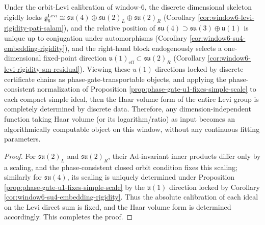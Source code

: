 \begin{corollary}\label{cor:window6-levi-haar-volume-rigidity}
Under the orbit-Levi calibration of window-\(6\), the discrete dimensional skeleton rigidly locks
\(
\mathfrak g^{\mathrm{Levi}}_6\cong \mathfrak{su}(4)\oplus \mathfrak{su}(2)_L\oplus \mathfrak{su}(2)_R
\)
(Corollary \ref{cor:window6-levi-rigidity-pati-salam}), and the relative position of \(\mathfrak{su}(4)\supset \mathfrak{su}(3)\oplus\mathfrak u(1)\) is unique up to conjugation under automorphisms (Corollary \ref{cor:window6-su4-embedding-rigidity}), and the right-hand block endogenously selects a one-dimensional fixed-point direction \(\mathfrak u(1)_{\mathrm{eff}}\subset \mathfrak{su}(2)_R\) (Corollary \ref{cor:window6-levi-rigidity-sm-residual}).
Viewing these \(u(1)\) directions locked by discrete certificate chains as phase-gate-transportable objects, and applying the phase-consistent normalization of Proposition \ref{prop:phase-gate-u1-fixes-simple-scale} to each compact simple ideal,
then the Haar volume form of the entire Levi group is completely determined by discrete data.
Therefore, any dimension-independent function taking Haar volume (or its logarithm/ratio) as input becomes an algorithmically computable object on this window, without any continuous fitting parameters.
\end{corollary}
\begin{proof}
For \(\mathfrak{su}(2)_L\) and \(\mathfrak{su}(2)_R\), their \(\mathrm{Ad}\)-invariant inner products differ only by a scaling, and the phase-consistent closed orbit condition fixes this scaling; similarly for \(\mathfrak{su}(4)\), its scaling is uniquely determined under Proposition \ref{prop:phase-gate-u1-fixes-simple-scale} by the \(\mathfrak u(1)\) direction locked by Corollary \ref{cor:window6-su4-embedding-rigidity}.
Thus the absolute calibration of each ideal on the Levi direct sum is fixed, and the Haar volume form is determined accordingly. This completes the proof.
\end{proof}

